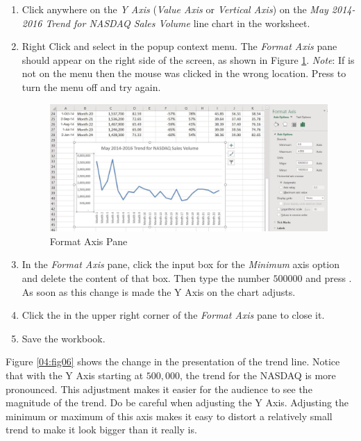 \begin{enumbox}
	\begin{enumerate}
		\item Click anywhere on the \textit{Y Axis} (\textit{Value Axis} or \textit{Vertical Axis}) on the \textit{May 2014-2016 Trend for NASDAQ Sales Volume} line chart in the  worksheet.
		\item Right Click and select  in the popup context menu. The \textit{Format Axis} pane should appear on the right side of the screen, as shown in Figure \ref{04:fig05}. \textit{Note}: If  is not on the menu then the mouse was clicked in the wrong location. Press  to turn the menu off and try again.
	
		\begin{figure}[H]
			\centering
			\includegraphics[width=\maxwidth{.95\linewidth}]{gfx/ch04_fig05}
			\caption{Format Axis Pane}
			\label{04:fig05}
		\end{figure}
	
		\item In the \textit{Format Axis} pane, click the input box for the \textit{Minimum} axis option and delete the content of that box. Then type the number $ 500000 $ and press . As soon as this change is made the Y Axis on the chart adjusts.
		\item Click the  in the upper right corner of the \textit{Format Axis} pane to close it.
		\item Save the  workbook.
	\end{enumerate}
\end{enumbox}
	
Figure \ref{04:fig06} shows the change in the presentation of the trend line. Notice that with the Y Axis starting at $ 500,000 $, the trend for the NASDAQ is more pronounced. This adjustment makes it easier for the audience to see the magnitude of the trend. Do be careful when adjusting the Y Axis. Adjusting the minimum or maximum of this axis makes it easy to distort a relatively small trend to make it look bigger than it really is.

